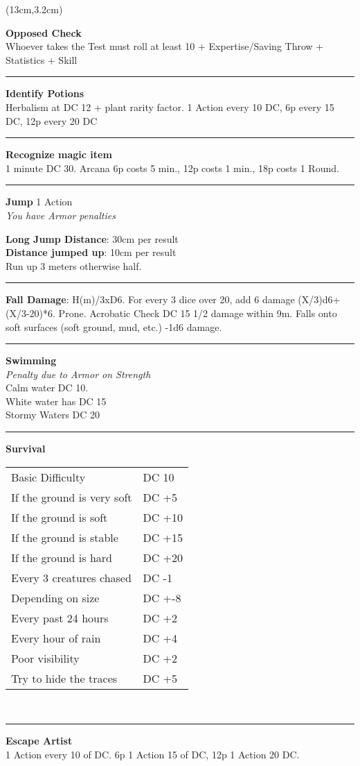 \documentclass[a4paper,12 pt,openany]{book}
\newcommand{\linex}{\rule{\textwidth}{0.4pt}}
\begin{document}
\begin{textblock*}{7cm}(13cm,3.2cm) %
	
\textbf{Opposed Check}\\
Whoever takes the Test must roll at least 10 + Expertise/Saving Throw + Statistics + Skill

\linex	
	
\textbf{Identify Potions}\\
Herbalism at DC 12 + plant rarity factor. 1 Action every 10 DC, 6p every 15 DC, 12p every 20 DC

\linex

\textbf{Recognize magic item}\\
1 minute DC 30. Arcana 6p costs 5 min., 12p costs 1 min., 18p costs 1 Round.
\linex

\textbf{Jump} 1 Action\\
\textit{You have Armor penalties}

\textbf{Long Jump Distance}: 30cm per result\\

\textbf{Distance jumped up}: 10cm per result\\

Run up 3 meters otherwise half.

\linex

\textbf{Fall Damage}: H(m)/3xD6. For every 3 dice over 20, add 6 damage (X/3)d6+(X/3-20)*6. Prone. Acrobatic Check DC 15 1/2 damage within 9m. Falls onto soft surfaces (soft ground, mud, etc.) -1d6 damage.

\linex

\textbf{Swimming}\\
\textit{Penalty due to Armor on Strength}\\
Calm water DC 10.\\
White water has DC 15\\
Stormy Waters DC 20

\linex

\textbf{Survival}
\begin{tabular}{ll}
Basic Difficulty & DC 10\\
If the ground is very soft& DC +5\\
If the ground is soft& DC +10\\
If the ground is stable& DC +15\\
If the ground is hard& DC +20\\
Every 3 creatures chased& DC -1\\
Depending on size & DC +-8\\
Every past 24 hours&DC +2\\
Every hour of rain&DC +4\\
Poor visibility&DC +2\\
Try to hide the traces&DC +5\\
\end{tabular}\\

\linex

\textbf{Escape Artist}\\
1 Action every 10 of DC. 6p 1 Action 15 of DC, 12p 1 Action 20 DC.

\end{textblock*}
\end{document}
